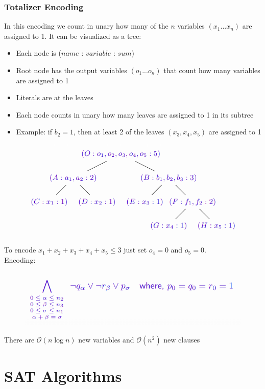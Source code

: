 \documentclass[10pt,a4paper]{report}
\begin{document}
\subsubsection{Totalizer Encoding}
In this encoding we count in unary how many of the $n$ variables $(x_1 ... x_n)$ are assigned to 1. It can be visualized as a tree:
\begin{itemize}
    \item Each node is ($name$ : $variable$ : $sum$)
    \item Root node has the output variables $(o_1 ... o_n)$ that count how many variables are assigned to 1
    \item Literals are at the leaves
    \item Each node counts in unary how many leaves are assigned to 1 in its subtree
    \item Example: if $b_2 = 1$, then at least 2 of the leaves $(x_3, x_4, x_5)$ are
    assigned to 1
\end{itemize}
\begin{figure}[H]
    \centering
    \includegraphics[scale=0.5]{2.png}
\end{figure}
To encode $x_1 + x_2 + x_3 + x_4 + x_5 \leq 3$ just set $o_4=0$ and $o_5=0$.\\
Encoding:
\begin{figure}[H]
    \centering
    \includegraphics[scale=0.5]{3.png}
\end{figure}
There are $\mathcal{O}(n\log n)$ new variables and $\mathcal{O}(n^2)$ new clauses

\section{SAT Algorithms}
\end{document}
